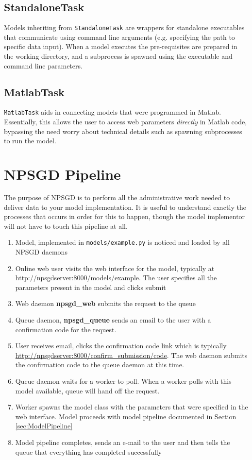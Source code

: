 \documentclass{article}
\newcommand{\mpath}[1]{\texttt{#1}}
\newcommand{\mclass}[1]{\texttt{#1}}
\begin{document}
\subsection{StandaloneTask}
Models inheriting from \mclass{StandaloneTask} are wrappers for standalone executables
that communicate using command line arguments (e.g. specifying the path to
specific data input). When a model executes the pre-requisites are prepared
in the working directory, and a subprocess is spawned using the executable and
command line parameters. 

\subsection{MatlabTask}
\mclass{MatlabTask} aids in connecting models that were programmed in Matlab. Essentially, this
allows the user to access web parameters \textit{directly} in Matlab code,
bypassing the need worry about technical details such as spawning subprocesses
to run the model.

\section{NPSGD Pipeline}
The purpose of NPSGD is to perform all the administrative work needed to deliver
data to your model implementation. It is useful to understand exactly the
processes that occurs in order for this to happen, though the model implementor
will not have to touch this pipeline at all.
\begin{enumerate}
   \item Model, implemented in \mpath{models/example.py} is noticed and loaded by all NPSGD daemons 
   \item Online web user visits the web interface for the model, typically at
   \url{http://npsgdserver:8000/models/example}. The user specifies all the parameters
   present in the model and clicks submit
   \item Web daemon \textbf{npsgd\_web} submits the request to the queue
   \item Queue daemon, \textbf{npsgd\_queue} sends an email to the user with a
   confirmation code for the request.
   \item User receives email, clicks the confirmation code link which is
   typically \url{http://npsgdserver:8000/confirm_submission/code}. The web
   daemon submits the confirmation code to the queue daemon at this time.
   \item Queue daemon waits for a worker to poll. When a worker polls with this
   model available, queue will hand off the request. 
   \item Worker spawns the model class with the parameters that were specified
   in the web interface. Model proceeds with model pipeline documented in
   Section \ref{sec:ModelPipeline}
   \item Model pipeline completes, sends an e-mail to the user and then tells
   the queue that everything has completed successfully
\end{enumerate}
\end{document}
